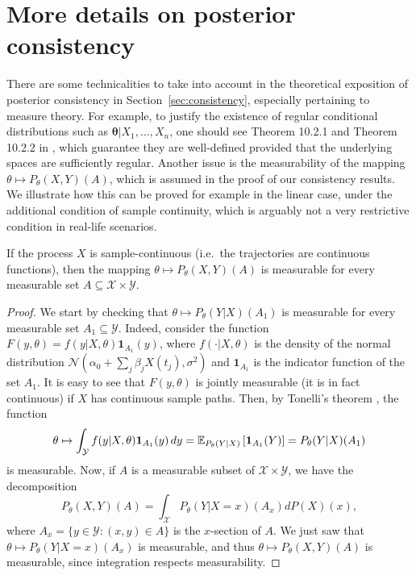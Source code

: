 \newpage
\section{More details on posterior consistency}\label{app:theory}

There are some technicalities to take into account in the theoretical exposition of posterior consistency in Section~\ref{sec:consistency}, especially pertaining to measure theory. For example, to justify the existence of regular conditional distributions such as \(\bm\theta|X_1,\dots,X_n\), one should see Theorem 10.2.1 and Theorem 10.2.2 in \citet{dudley2002real}, which guarantee they are well-defined provided that the underlying spaces are sufficiently regular. Another issue is the measurability of the mapping \(\theta \mapsto P_\theta(X,Y)(A)\), which is assumed in the proof of our consistency results. We illustrate how this can be proved for example in the linear case, under the additional condition of sample continuity, which is arguably not a very restrictive condition in real-life scenarios.

\begin{proposition}
  If the process \(X\) is sample-continuous (i.e.\ the trajectories are continuous functions), then the mapping \(\theta \mapsto P_\theta(X,Y)(A)\) is measurable for every measurable set \(A \subseteq \mathcal X \times \mathcal Y\).
\end{proposition}

\begin{proof}
  We start by checking that \(\theta \mapsto P_\theta(Y|X)(A_1)\) is measurable for every measurable set \(A_1\subseteq \mathcal Y\). Indeed, consider the function \(F(y,\theta)=f(y|X,\theta)\bm{1}_{A_1}(y)\), where \(f(\cdot|X,\theta)\) is the density of the normal distribution \(\mathcal N(\alpha_0 + \sum_j \beta_j X(t_j), \sigma^2)\) and \(\bm{1}_{A_1}\) is the indicator function of the set \(A_1\). It is easy to see that \(F(y,\theta)\) is jointly measurable (it is in fact continuous) if \(X\) has continuous sample paths. Then, by Tonelli's theorem \citep[e.g.][Theorem~2.37]{folland1999real}, the function
  \[
    \theta \mapsto \int_{\mathcal Y} f(y|X,\theta)\bm{1}_{A_1}(y)\, dy = \mathbb{E}_{P_\theta(Y|X)}\left[\bm{1}_{A_1}(Y)\right] = P_\theta(Y|X)(A_1)
  \]
  is measurable. Now, if \(A\) is a measurable subset of \(\mathcal X \times \mathcal Y\), we have the decomposition
  \[
    P_\theta(X,Y)(A)  = \int_{\mathcal X} P_\theta(Y|X=x)(A_x) dP(X)(x),
  \]
  where \(A_x=\{y\in\mathcal Y: (x,y) \in A\}\) is the \(x\)-section of \(A\). We just saw that \(\theta \mapsto P_\theta(Y|X=x)(A_x)\) is measurable, and thus \(\theta \mapsto P_\theta(X,Y)(A)\) is measurable, since integration respects measurability.
\end{proof}

